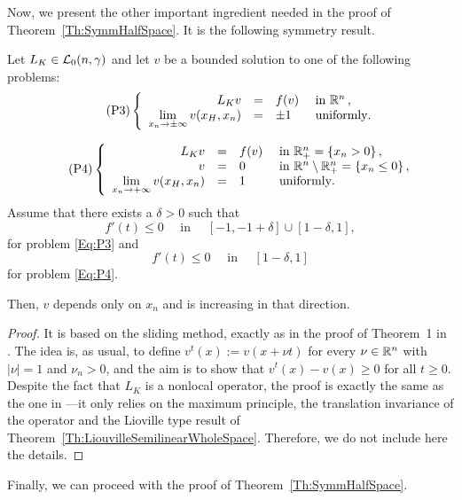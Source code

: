 Now, we present the other important ingredient needed in the proof of Theorem~\ref{Th:SymmHalfSpace}. It is the following symmetry result.

\begin{proposition}
\label{Prop:HalfSpaceLimUnif}
Let $L_K \in \mathcal{L}_0(n,\gamma)$ and let $v$ be a bounded solution to one of the following problems:
\begin{equation}
\tag{P3}
\label{Eq:P3}
\left\{\begin{array}{rcll}
L_K  v &=& f(v)  &\textrm{ in }\mathbb{R}^n\,,\\
\displaystyle \lim_{x_n \to \pm \infty} v(x_H,x_n) &=& \pm 1 \,\,\, &\textrm{ uniformly}.
\end{array} \right.
\end{equation}

\begin{equation}
\tag{P4}
\label{Eq:P4}
\left\{\begin{array}{rcll}
L_K  v &=& f(v)  &\textrm{ in }\mathbb{R}^n_+ = \{ x_n>0\} \,,\\
v &=& 0  &\textrm{ in } \mathbb{R}^n \setminus \mathbb{R}^n_+ = \{ x_n\leq 0\}\,,\\
\displaystyle \lim_{x_n \to + \infty} v(x_H,x_n) &=& 1 \,\,\, &\textrm{ uniformly}.
\end{array} \right.
\end{equation}
\reqnomode
Assume that there exists a $\delta > 0$ such that
$$ f'(t) \leq 0 \quad \text{ in } \quad [-1,-1+\delta]\cup[1-\delta,1], $$
for problem \eqref{Eq:P3} and
$$ f'(t) \leq 0 \quad \text{ in } \quad [1-\delta,1] $$
for problem \eqref{Eq:P4}.

Then, $v$ depends only on $x_n$ and is increasing in that direction.
\end{proposition}

\begin{proof}
It is based on the sliding method, exactly as in the proof of Theorem~1 in \cite{BerestyckiHamelMonneau}. The idea is, as usual,   to define $ v^t(x) := v(x+\nu t) $ for every $\nu\in\mathbb{R}^n$ with $|\nu|=1$ and $\nu_n>0$, and the aim is to show that $v^t(x)-v(x)\geq 0$ for all $t\geq 0$. Despite the fact that $L_K$ is a nonlocal operator, the proof is exactly the same as the one in \cite{BerestyckiHamelMonneau} ---it only relies on the maximum principle, the translation invariance of the operator and the Lioville type result of Theorem~\ref{Th:LiouvilleSemilinearWholeSpace}. Therefore, we do not include here the details.
\end{proof}






Finally, we can proceed with the proof of Theorem~\ref{Th:SymmHalfSpace}.

